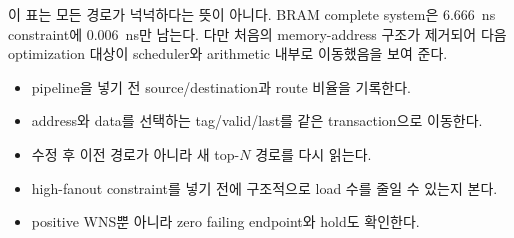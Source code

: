 이 표는 모든 경로가 넉넉하다는 뜻이 아니다. BRAM complete system은 6.666~ns
constraint에 0.006~ns만 남는다. 다만 처음의 memory-address 구조가 제거되어
다음 optimization 대상이 scheduler와 arithmetic 내부로 이동했음을 보여 준다.

\begin{checklistbox}
\begin{itemize}
  \item pipeline을 넣기 전 source/destination과 route 비율을 기록한다.
  \item address와 data를 선택하는 tag/valid/last를 같은 transaction으로 이동한다.
  \item 수정 후 이전 경로가 아니라 새 top-$N$ 경로를 다시 읽는다.
  \item high-fanout constraint를 넣기 전에 구조적으로 load 수를 줄일 수 있는지 본다.
  \item positive WNS뿐 아니라 zero failing endpoint와 hold도 확인한다.
\end{itemize}
\end{checklistbox}
